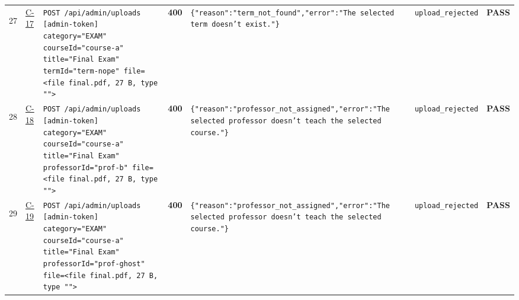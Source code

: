 \documentclass[10pt,a4paper]{article}
\begin{document}
\begin{landscape}
\begin{longtable}{@{}P{0.6cm}P{0.9cm}P{8.5cm}P{1.0cm}P{6.2cm}P{4.2cm}P{1.1cm}@{}}
\hypertarget{call27}{27} & \hyperlink{test-C-17}{C-17} & \texttt{POST /\allowbreak{}api/\allowbreak{}admin/\allowbreak{}uploads [admin-\allowbreak{}token] category=\allowbreak{}"\allowbreak{}EXAM"\allowbreak{} courseId=\allowbreak{}"\allowbreak{}course-\allowbreak{}a"\allowbreak{} title=\allowbreak{}"\allowbreak{}Final Exam"\allowbreak{} termId=\allowbreak{}"\allowbreak{}term-\allowbreak{}nope"\allowbreak{} file=\allowbreak{}<file final.\allowbreak{}pdf,\allowbreak{} 27 B,\allowbreak{} type "\allowbreak{}"\allowbreak{}>} & \textcolor{warnamber}{\textbf{400}} & \texttt{\{"\allowbreak{}reason"\allowbreak{}:\allowbreak{}"\allowbreak{}term\_\allowbreak{}not\_\allowbreak{}found"\allowbreak{},\allowbreak{}"\allowbreak{}error"\allowbreak{}:\allowbreak{}"\allowbreak{}The selected term doesn't exist.\allowbreak{}"\allowbreak{}\}} & \texttt{upload\_\allowbreak{}rejected} & \textcolor{passgreen}{\textbf{PASS}} \\
\hypertarget{call28}{28} & \hyperlink{test-C-18}{C-18} & \texttt{POST /\allowbreak{}api/\allowbreak{}admin/\allowbreak{}uploads [admin-\allowbreak{}token] category=\allowbreak{}"\allowbreak{}EXAM"\allowbreak{} courseId=\allowbreak{}"\allowbreak{}course-\allowbreak{}a"\allowbreak{} title=\allowbreak{}"\allowbreak{}Final Exam"\allowbreak{} professorId=\allowbreak{}"\allowbreak{}prof-\allowbreak{}b"\allowbreak{} file=\allowbreak{}<file final.\allowbreak{}pdf,\allowbreak{} 27 B,\allowbreak{} type "\allowbreak{}"\allowbreak{}>} & \textcolor{warnamber}{\textbf{400}} & \texttt{\{"\allowbreak{}reason"\allowbreak{}:\allowbreak{}"\allowbreak{}professor\_\allowbreak{}not\_\allowbreak{}assigned"\allowbreak{},\allowbreak{}"\allowbreak{}error"\allowbreak{}:\allowbreak{}"\allowbreak{}The selected professor doesn't teach the selected course.\allowbreak{}"\allowbreak{}\}} & \texttt{upload\_\allowbreak{}rejected} & \textcolor{passgreen}{\textbf{PASS}} \\
\hypertarget{call29}{29} & \hyperlink{test-C-19}{C-19} & \texttt{POST /\allowbreak{}api/\allowbreak{}admin/\allowbreak{}uploads [admin-\allowbreak{}token] category=\allowbreak{}"\allowbreak{}EXAM"\allowbreak{} courseId=\allowbreak{}"\allowbreak{}course-\allowbreak{}a"\allowbreak{} title=\allowbreak{}"\allowbreak{}Final Exam"\allowbreak{} professorId=\allowbreak{}"\allowbreak{}prof-\allowbreak{}ghost"\allowbreak{} file=\allowbreak{}<file final.\allowbreak{}pdf,\allowbreak{} 27 B,\allowbreak{} type "\allowbreak{}"\allowbreak{}>} & \textcolor{warnamber}{\textbf{400}} & \texttt{\{"\allowbreak{}reason"\allowbreak{}:\allowbreak{}"\allowbreak{}professor\_\allowbreak{}not\_\allowbreak{}assigned"\allowbreak{},\allowbreak{}"\allowbreak{}error"\allowbreak{}:\allowbreak{}"\allowbreak{}The selected professor doesn't teach the selected course.\allowbreak{}"\allowbreak{}\}} & \texttt{upload\_\allowbreak{}rejected} & \textcolor{passgreen}{\textbf{PASS}} \\

\end{longtable}
\end{landscape}
\end{document}
